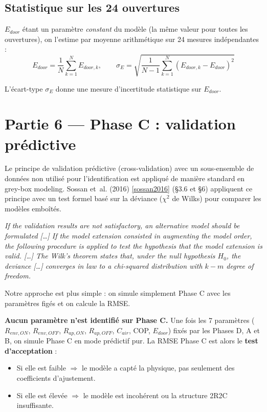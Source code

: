 \documentclass[11pt,a4paper]{article}
\begin{document}
\subsection{Statistique sur les 24 ouvertures}

$E_{door}$ étant un paramètre \emph{constant} du modèle (la même valeur pour toutes les
ouvertures), on l'estime par moyenne arithmétique sur 24 mesures indépendantes :
\begin{equation}
\boxed{\;E_{door} = \frac{1}{N}\sum_{k=1}^N E_{door,k},
\qquad \sigma_E = \sqrt{\frac{1}{N-1}\sum_{k=1}^N (E_{door,k} - E_{door})^2}\;}
\end{equation}

L'écart-type $\sigma_E$ donne une mesure d'incertitude statistique sur $E_{door}$.

\section{Partie 6 — Phase C : validation prédictive}

Le principe de validation prédictive (cross-validation) avec un sous-ensemble de données
non utilisé pour l'identification est appliqué de manière standard en grey-box modeling.
Sossan et~al. (2016) \ref{sossan2016} (\S3.6 et \S6) appliquent ce principe avec un test
formel basé sur la déviance ($\chi^2$ de Wilks) pour comparer les modèles emboîtés.

\begin{tcolorbox}[breakable,enhanced jigsaw,colback=yellow!10,colframe=yellow!50!black,boxrule=0.4pt,arc=2pt,
title=\textbf{Extrait textuel — Sossan et~al.\ (2016) \ref{sossan2016}, \S3.6}]
\og{} \emph{If the validation results are not satisfactory, an alternative model should
be formulated [\dots] If the model extension consisted in augmenting the model order, the
following procedure is applied to test the hypothesis that the model extension is valid.
[\dots] The Wilk's theorem states that, under the null hypothesis $H_0$, the deviance
[\dots] converges in law to a chi-squared distribution with $k - m$ degree of freedom.}
\fg{}
\end{tcolorbox}

Notre approche est plus simple : on simule simplement Phase C avec les paramètres figés
et on calcule la RMSE.

\textbf{Aucun paramètre n'est identifié sur Phase C.} Une fois les 7 paramètres
($R_{env,ON}$, $R_{env,OFF}$, $R_{ap,ON}$, $R_{ap,OFF}$, $C_{air}$, COP,
$E_{door}$) fixés par les Phases D, A et B, on simule Phase C en mode prédictif
pur. La RMSE Phase C est alors le \textbf{test d'acceptation} :
\begin{itemize}[itemsep=0pt]
\item Si elle est faible $\Rightarrow$ le modèle a capté la physique, pas seulement des
coefficients d'ajustement.
\item Si elle est élevée $\Rightarrow$ le modèle est incohérent ou la structure 2R2C
insuffisante.
\end{itemize}
\end{document}
